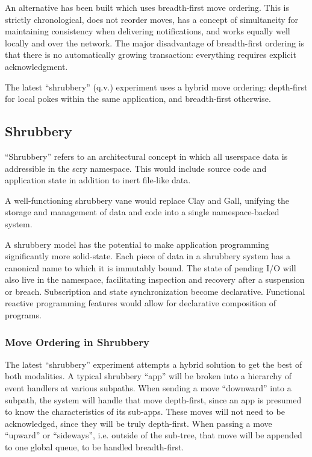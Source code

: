\documentclass[twoside]{article}
\begin{document}
An alternative has been built which uses breadth-first move ordering.  This is strictly chronological, does not reorder moves, has a concept of simultaneity for maintaining consistency when delivering notifications, and works equally well locally and over the network.  The major disadvantage of breadth-first ordering is that there is no automatically growing transaction: everything requires explicit acknowledgment.

The latest ``shrubbery'' (q.v.) experiment uses a hybrid move ordering: depth-first for local pokes within the same application, and breadth-first otherwise.

\subsection{Shrubbery}

``Shrubbery'' refers to an architectural concept in which all user\-space data is addressible in the scry namespace.  This would include source code and application state in addition to inert file-like data.

A well-functioning shrubbery vane would replace Clay and Gall, unifying the storage and management of data and code into a single namespace-backed system.

A shrubbery model has the potential to make application programming significantly more solid-state.  Each piece of data in a shrubbery system has a canonical name to which it is immutably bound.  The state of pending I/O will also live in the namespace, facilitating inspection and recovery after a suspension or breach.  Subscription and state synchronization become declarative.  Functional reactive programming features would allow for declarative composition of programs.

\subsubsection{Move Ordering in Shrubbery}

The latest ``shrubbery'' experiment attempts a hybrid solution to get the best of both modalities.  A typical shrubbery ``app'' will be broken into a hierarchy of event handlers at various subpaths.  When sending a move ``downward'' into a subpath, the system will handle that move depth-first, since an app is presumed to know the characteristics of its sub-apps.  These moves will not need to be acknowledged, since they will be truly depth-first.  When passing a move ``upward'' or ``sideways'', i.e. outside of the sub-tree, that move will be appended to one global queue, to be handled breadth-first.
\end{document}
